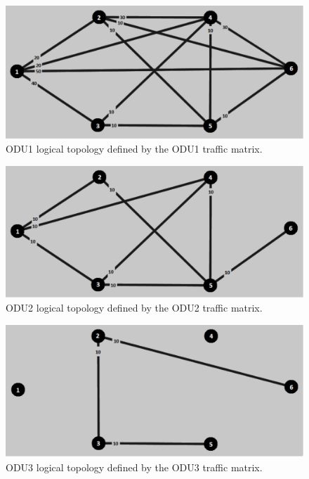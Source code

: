 \begin{figure}[H]
\centering
\includegraphics[width=13cm]{sdf/heuristic/opaque_survivability/figures/logical_topology_odu1_medium}
\caption{ODU1 logical topology defined by the ODU1 traffic matrix.}
\label{logical_ODU1_surv_ref_medium_heuristic}
\end{figure}

\begin{figure}[H]
\centering
\includegraphics[width=13cm]{sdf/heuristic/opaque_survivability/figures/logical_topology_odu2_medium}
\caption{ODU2 logical topology defined by the ODU2 traffic matrix.}
\label{logical_ODU2_surv_ref_medium_heuristic}
\end{figure}

\begin{figure}[H]
\centering
\includegraphics[width=13cm]{sdf/heuristic/opaque_survivability/figures/logical_topology_odu3_medium}
\caption{ODU3 logical topology defined by the ODU3 traffic matrix.}
\label{logical_ODU3_surv_ref_medium_heuristic}
\end{figure}

